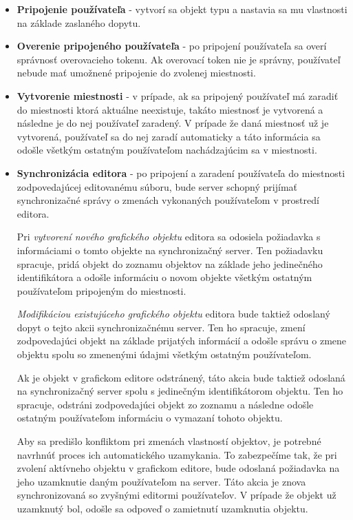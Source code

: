 \begin{itemize}
	\item \textbf{Pripojenie používateľa} - vytvorí sa objekt typu  a nastavia sa mu vlastnosti na základe zaslaného dopytu. 
	
	\item \textbf{Overenie pripojeného používateľa} - po pripojení používateľa sa overí správnosť overovacieho tokenu. Ak overovací token nie je správny, používateľ nebude mať umožnené pripojenie do zvolenej miestnosti.
	
	\item \textbf{Vytvorenie miestnosti} - v prípade, ak sa pripojený používateľ má zaradiť do miestnosti ktorá aktuálne neexistuje, takáto miestnosť je vytvorená a následne je do nej používateľ zaradený. V prípade že daná miestnosť už je vytvorená, používateľ sa do nej zaradí automaticky a táto informácia sa odošle všetkým ostatným používateľom nachádzajúcim sa v miestnosti.
	
	\item \textbf{Synchronizácia editora} - po pripojení a zaradení používateľa do miestnosti zodpovedajúcej editovanému súboru, bude server schopný prijímať synchronizačné správy o zmenách vykonaných používateľom v prostredí editora. 
	
	Pri \textit{vytvorení nového grafického objektu} editora sa odosiela požiadavka s informáciami o tomto objekte na synchronizačný server. Ten požiadavku spracuje, pridá objekt do zoznamu objektov na základe jeho jedinečného identifikátora a odošle informáciu o novom objekte všetkým ostatným používateľom pripojeným do miestnosti.
	
	\textit{Modifikáciou existujúceho grafického objektu} editora bude taktiež odoslaný dopyt o tejto akcii synchronizačnému server. Ten ho spracuje, zmení zodpovedajúci objekt na základe prijatých informácií a odošle správu o zmene objektu spolu so zmenenými údajmi všetkým ostatným používateľom.
	
	Ak je objekt v grafickom editore odstránený, táto akcia bude taktiež odoslaná na synchronizačný server spolu s jedinečným identifikátorom objektu. Ten ho spracuje, odstráni zodpovedajúci objekt zo zoznamu a následne odošle ostatným používateľom informáciu o vymazaní tohoto objektu.
	
	Aby sa predišlo konfliktom pri zmenách vlastností objektov, je potrebné navrhnúť proces ich automatického uzamykania. To zabezpečíme tak, že pri zvolení aktívneho objektu v grafickom editore, bude odoslaná požiadavka na jeho uzamknutie daným používateľom na server. Táto akcia je znova synchronizovaná so zvyšnými editormi používateľov. V prípade že objekt už uzamknutý bol, odošle sa odpoveď o zamietnutí uzamknutia objektu.
	

\end{itemize}

